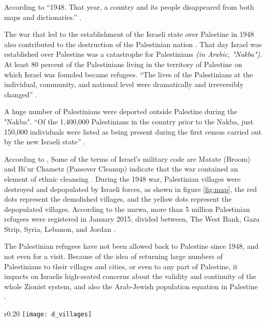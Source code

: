  According to \cite{Sanbar2007} “1948. That year, a country and its people disappeared from both maps and dictionaries.” \citep{Sanbar2007}. 



The war that led to the establishment of the Israeli state over Palestine in 1948 also contributed to the destruction of the Palestinian nation \citep{Sadi2007}. That day Israel was established over Palestine was a catastrophe for Palestinians \textit{(in Arabic, "Nakba")}. At least 80 percent of the Palestinians living in the territory of Palestine on which Israel was founded became refugees. “The lives of the Palestinians at the individual, community, and national level were dramatically and irreversibly changed” \citep{Sadi2007}.

A huge number of Palestinians were deported outside Palestine during the "Nakba". “Of the
1,400,000 Palestinians in the country prior to the Nakba, just 150,000 individuals were listed
as being present during the first census carried out by the new Israeli state” \citep{Sanbar2007}.



According to \cite{Falah1996}, Some of the terms of Israel's military code are Matate (Broom) and Bi'ur Chametz (Passover Cleanup) indicate that the war contained an element of ethnic cleansing \citep{Falah1996, Pappe2006}. During the 1948 war, Palestinian villages were destroyed and depopulated by Israeli forces, as shown in figure \ref{fig:map}, the red dots represent the demolished villages, and the yellow dots represent the depopulated villages. 
According to the \acrshort{unrwa}, more than 5 million Palestinian refugees were registered in January 2015, divided between, The West Bank, Gaza
Strip, Syria, Lebanon, and Jordan \citep{Khalidi2015, DajaniDaoudi2011}. 

The Palestinian refugees have not been allowed back to Palestine since 1948, and not even for a visit. Because of the idea of returning large numbers of Palestinians to their villages and cities, or even to any part of Palestine, it impacts on Israelis high-seated concerns about the validity and continuity of the whole Zionist system, and also the Arab-Jewish population equation in Palestine \citep{Khalidi2016}.

\begin{wrapfigure}{r}{0.20\textwidth} %
    \centering
    \texttt{[image: d\_villages]}
    \caption{Demolished and depopulated villages - Palestine Open Maps, © 2018  Visualizing Palestine}
    \label{fig:map}
\end{wrapfigure} 


